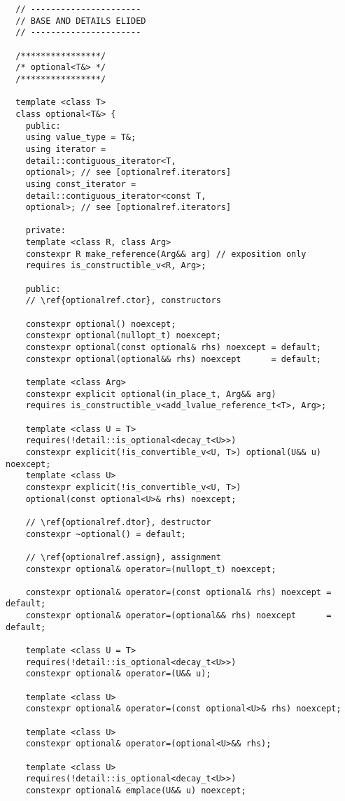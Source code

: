 \documentclass[a4paper,10pt,oneside,openany,final,article]{memoir}
\begin{document}
\begin{verbatim}
  // ----------------------
  // BASE AND DETAILS ELIDED
  // ----------------------

  /****************/
  /* optional<T&> */
  /****************/

  template <class T>
  class optional<T&> {
    public:
    using value_type = T&;
    using iterator =
    detail::contiguous_iterator<T,
    optional>; // see [optionalref.iterators]
    using const_iterator =
    detail::contiguous_iterator<const T,
    optional>; // see [optionalref.iterators]

    private:
    template <class R, class Arg>
    constexpr R make_reference(Arg&& arg) // exposition only
    requires is_constructible_v<R, Arg>;

    public:
    // \ref{optionalref.ctor}, constructors

    constexpr optional() noexcept;
    constexpr optional(nullopt_t) noexcept;
    constexpr optional(const optional& rhs) noexcept = default;
    constexpr optional(optional&& rhs) noexcept      = default;

    template <class Arg>
    constexpr explicit optional(in_place_t, Arg&& arg)
    requires is_constructible_v<add_lvalue_reference_t<T>, Arg>;

    template <class U = T>
    requires(!detail::is_optional<decay_t<U>>)
    constexpr explicit(!is_convertible_v<U, T>) optional(U&& u) noexcept;
    template <class U>
    constexpr explicit(!is_convertible_v<U, T>)
    optional(const optional<U>& rhs) noexcept;

    // \ref{optionalref.dtor}, destructor
    constexpr ~optional() = default;

    // \ref{optionalref.assign}, assignment
    constexpr optional& operator=(nullopt_t) noexcept;

    constexpr optional& operator=(const optional& rhs) noexcept = default;
    constexpr optional& operator=(optional&& rhs) noexcept      = default;

    template <class U = T>
    requires(!detail::is_optional<decay_t<U>>)
    constexpr optional& operator=(U&& u);

    template <class U>
    constexpr optional& operator=(const optional<U>& rhs) noexcept;

    template <class U>
    constexpr optional& operator=(optional<U>&& rhs);

    template <class U>
    requires(!detail::is_optional<decay_t<U>>)
    constexpr optional& emplace(U&& u) noexcept;


\end{verbatim}
\end{document}
